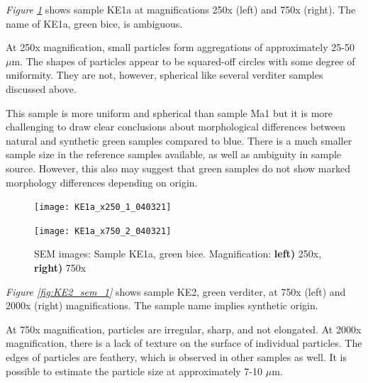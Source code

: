 
\textit{Figure \ref{fig:KE1a_sem_1}} shows sample KE1a at magnifications 250x (left) and 750x (right). The name of KE1a, green bice, is ambiguous.

At 250x magnification, small particles form aggregations of approximately 25-50 $\mu$m. The shapes of particles appear to be squared-off circles with some degree of uniformity. They are not, however, spherical like several verditer samples discussed above. 

This sample is more uniform and spherical than sample Ma1 but it is more challenging to draw clear conclusions about morphological differences between natural and synthetic green samples compared to blue. There is a much smaller sample size in the reference samples available, as well as ambiguity in sample source. However, this also may suggest that green samples do not show marked morphology differences depending on origin.

\begin{figure}[H]
\centering
\begin{minipage}{.45\textwidth}
  \centering
  \texttt{[image: KE1a\_x250\_1\_040321]}
\end{minipage}
\begin{minipage}{.45\textwidth}
  \centering
  \texttt{[image: KE1a\_x750\_2\_040321]}
\end{minipage}
\caption[SEM images: Sample KE1a, green bice]{SEM images: Sample KE1a, green bice. Magnification: \textbf{left)} 250x, \textbf{right)} 750x}
\label{fig:KE1a_sem_1}
\end{figure}




\textit{Figure \ref{fig:KE2_sem_1}} shows sample KE2, green verditer, at 750x (left) and 2000x (right) magnifications. The sample name implies synthetic origin. 

At 750x magnification, particles are irregular, sharp, and not elongated. At 2000x magnification, there is a lack of texture on the surface of individual particles. The edges of particles are feathery, which is observed in other samples as well. It is possible to estimate the particle size at approximately 7-10 $\mu$m. 


